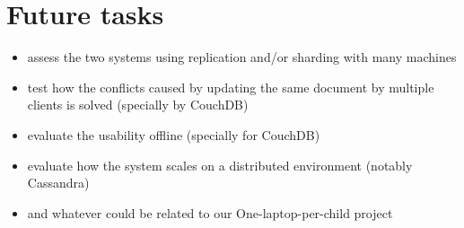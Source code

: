 \documentclass[a4paper,10pt]{article}
\begin{document}
\paragraph{}


\section{Future tasks} 
\begin{itemize}
 \item assess the two systems using replication and/or sharding with many machines 
 \item test how the conflicts caused by updating the same document by multiple clients is solved (specially by CouchDB)
 \item evaluate the usability offline (specially for CouchDB)
 \item evaluate how the system scales on a distributed environment (notably Cassandra)
 \item and whatever could be related to our One-laptop-per-child project 
\end{itemize}


\clearpage
\end{document}
